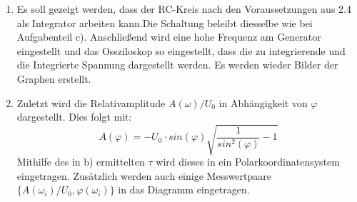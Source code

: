\begin{enumerate}
       \item Es soll gezeigt werden, dass der RC-Kreis nach den Voraussetzungen aus 2.4 als
       Integrator arbeiten kann.Die Schaltung beleibt diesselbe wie bei Aufgabenteil c).
       Anschließend wird eine hohe Frequenz am Generator eingestellt und das Ossziloskop so eingestellt, dass
       die zu integrierende und die Integrierte Spannung dargestellt werden. Es werden wieder
       Bilder der Graphen erstellt.

       \item Zuletzt wird die Relativamplitude $A(\omega) / U_0$ in Abhängigkeit von $\varphi$ dargestellt.
       Dies folgt mit:
       \begin{equation}
         A(\varphi) = -U_0\cdot sin(\varphi)\sqrt{\frac{1}{sin^2(\varphi)}-1}
       \end{equation}
       Mithilfe des in b) ermittelten $\tau$ wird dieses in ein Polarkoordinatensystem eingetragen.
       Zusätzlich werden auch einige Messwertpaare $\{A(\omega_i)/U_0,\varphi(\omega_i)\}$ in das Diagramm
        eingetragen.

\end{enumerate}
